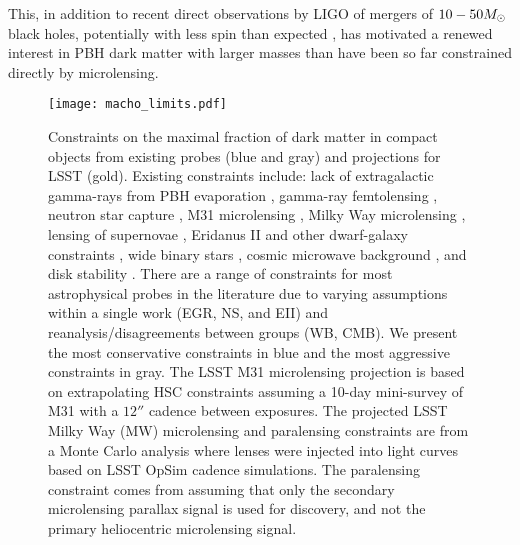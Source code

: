This, in addition to recent direct observations by LIGO of mergers of $10-50 M_\odot$ black holes, potentially with less spin than expected \citep{1602.03837, LIGOScientific:2018b, LIGOScientific:2018a},
has motivated a renewed interest in PBH dark matter with larger masses than have been so far constrained directly by microlensing.

\begin{figure}[t]
\centering
\texttt{[image: macho\_limits.pdf]}
\caption{\label{fig:macho_constraints}
    Constraints on the maximal fraction of dark matter in compact objects from existing probes (blue and gray) and projections for LSST (gold).
    Existing constraints include: lack of extragalactic gamma-rays from PBH evaporation \citep[EGR;][]{0912.5297, 1604.05349}, gamma-ray femtolensing \citep[GF;][]{1204.2056}, neutron star capture \citep[NS][]{1301.4984}, M31 microlensing \citep[M31ML][]{1701.02151}, Milky Way microlensing \citep[MWML;][]{2007A&A...469..387T, 2001ApJ...550L.169A, 2009MNRAS.397.1228W}, lensing of supernovae \citep[LSN;][]{1712.02240,1712.06574}, Eridanus II and other dwarf-galaxy constraints \citep[EII;][]{2016ApJ...824L..31B, 1611.05052}, wide binary stars \citep[WB;][]{2009MNRAS.396L..11Q, 2004ApJ...601..311Y}, cosmic microwave background \citep[CMB;][]{2017PhRvD..95d3534A, 2008ApJ...680..829R}, and disk stability \citep[DS;][]{1985ApJ...299..633L, 1994ApJ...437..184X}.
    There are a range of constraints for most astrophysical probes in the literature due to varying assumptions within a single work (EGR, NS, and EII) and reanalysis/disagreements between groups (WB, CMB).
    We present the most conservative constraints in blue and the most aggressive constraints in gray.
    The LSST M31 microlensing projection is based on extrapolating HSC constraints \citep{1701.02151} assuming a 10-day mini-survey of M31 with a $12\second$ cadence between exposures.
    The projected LSST Milky Way (MW) microlensing and paralensing constraints are from a Monte Carlo analysis where lenses were injected into light curves based on LSST OpSim cadence simulations. 
    The paralensing constraint comes from assuming that only the secondary microlensing parallax signal is used for discovery, and not the primary heliocentric microlensing signal.
}
\end{figure}

